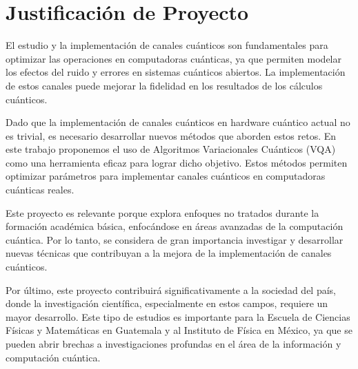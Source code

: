 \section{Justificación de Proyecto}
El estudio y la implementación de canales cuánticos son fundamentales para optimizar las operaciones en computadoras cuánticas, ya que permiten modelar los efectos del ruido y errores en sistemas cuánticos abiertos. La implementación de estos canales puede mejorar la fidelidad en los resultados de los cálculos cuánticos.

Dado que la implementación de canales cuánticos en hardware cuántico actual no es trivial, es necesario desarrollar nuevos métodos que aborden estos retos. En este trabajo proponemos el uso de Algoritmos Variacionales Cuánticos (VQA) como una herramienta eficaz para lograr dicho objetivo. Estos métodos permiten optimizar parámetros para implementar canales cuánticos en computadoras cuánticas reales.

Este proyecto es relevante porque explora enfoques no tratados durante la formación académica básica, enfocándose en áreas avanzadas de la computación cuántica. Por lo tanto, se considera de gran importancia investigar y desarrollar nuevas técnicas que contribuyan a la mejora de la implementación de canales cuánticos. 

Por último, este proyecto contribuirá significativamente a la sociedad del país, donde la investigación científica, especialmente en estos campos, requiere un mayor desarrollo. Este tipo de estudios es importante para la Escuela de Ciencias Físicas y Matemáticas en Guatemala y al Instituto de Física en México, ya que se pueden abrir brechas a investigaciones profundas en el área de la información y computación cuántica.